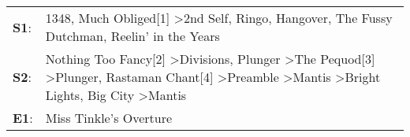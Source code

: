 \begin{supertabular}{p{0.03\textwidth}p{0.92\textwidth}}
 \textbf{S1}:  &                                                                                                                                                                                                       1348\textsuperscript{}, \enspace Much Obliged[1]\textsuperscript{} \textgreater \enspace 2nd Self\textsuperscript{}, \enspace Ringo\textsuperscript{}, \enspace Hangover\textsuperscript{}, \enspace The Fussy Dutchman\textsuperscript{}, \enspace Reelin' in the Years\textsuperscript{}  \enspace  \\
 \textbf{S2}:  &  Nothing Too Fancy[2]\textsuperscript{} \textgreater \enspace Divisions\textsuperscript{}, \enspace Plunger\textsuperscript{} \textgreater \enspace The Pequod[3]\textsuperscript{} \textgreater \enspace Plunger\textsuperscript{}, \enspace Rastaman Chant[4]\textsuperscript{} \textgreater \enspace Preamble\textsuperscript{} \textgreater \enspace Mantis\textsuperscript{} \textgreater \enspace Bright Lights, Big City\textsuperscript{} \textgreater \enspace Mantis\textsuperscript{}  \enspace  \\
 \textbf{E1}:  &                                                                                                                                                                                                                                                                                                                                                                                                                                                         Miss Tinkle's Overture\textsuperscript{}  \enspace  \\
\end{supertabular}
